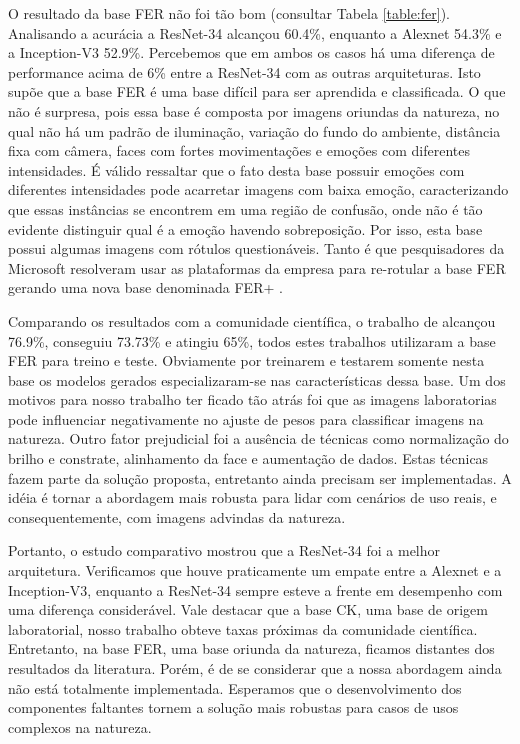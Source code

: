 O resultado da base FER não foi tão bom (consultar Tabela \ref{table:fer}). Analisando a acurácia a ResNet-34 alcançou 60.4\%, enquanto a Alexnet 54.3\% e a Inception-V3 52.9\%. Percebemos que em ambos os casos há uma diferença de performance acima de 6\% entre a ResNet-34 com as outras arquiteturas. Isto supõe que a base FER é uma base difícil para ser aprendida e classificada. O que não é surpresa, pois essa base é composta por imagens oriundas da natureza, no qual não há um padrão de iluminação, variação do fundo do ambiente, distância fixa com câmera, faces com fortes movimentações e emoções com diferentes intensidades. É válido ressaltar que o fato desta base possuir emoções com diferentes intensidades pode acarretar imagens com baixa emoção, caracterizando que essas instâncias se encontrem em uma região de confusão, onde não é tão evidente distinguir qual é a emoção havendo sobreposição. Por isso, esta base possui algumas imagens com rótulos questionáveis. Tanto é que pesquisadores da Microsoft resolveram usar as plataformas da empresa para re-rotular a base FER gerando uma nova base denominada FER+ \citep{barsoum2016training}.      

Comparando os resultados com a comunidade científica, o trabalho de \cite{art7} alcançou 76.9\%, \cite{kim2016fusing} conseguiu 73.73\% e \cite{art5} atingiu 65\%, todos estes trabalhos utilizaram a base FER para treino e teste. Obviamente por treinarem e testarem somente nesta base os modelos gerados especializaram-se nas características dessa base. Um dos motivos para nosso trabalho ter ficado tão atrás foi que as imagens laboratorias pode influenciar negativamente no ajuste de pesos para classificar imagens na natureza. Outro fator prejudicial foi a ausência de técnicas como normalização do brilho e constrate, alinhamento da face e aumentação de dados. Estas técnicas fazem parte da solução proposta, entretanto ainda precisam ser implementadas. A idéia é tornar a abordagem mais robusta para lidar com cenários de uso reais, e consequentemente, com imagens advindas da natureza.    

Portanto, o estudo comparativo mostrou que a ResNet-34 foi a melhor arquitetura. Verificamos que houve praticamente um empate entre a Alexnet e a Inception-V3, enquanto a ResNet-34 sempre esteve a frente em desempenho com uma diferença considerável. Vale destacar que a base CK, uma base de origem laboratorial, nosso trabalho obteve taxas próximas da comunidade científica. Entretanto, na base FER, uma base oriunda da natureza, ficamos distantes dos resultados da literatura. Porém, é de se considerar que a nossa abordagem ainda não está totalmente implementada. Esperamos que o desenvolvimento dos componentes faltantes tornem a solução mais robustas para casos de usos complexos na natureza. 

